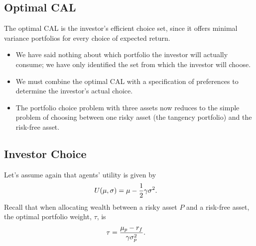 \documentclass[letterpaper,10pt,english]{sphinxmanual}
\begin{document}
\subsection{Optimal CAL}
\label{portfolioOpt:id8}
The optimal CAL is the investor's efficient choice set, since it
offers minimal variance portfolios for every choice of expected
return.
\begin{itemize}
\item {} 
We have said nothing about which portfolio the investor will
actually consume; we have only identified the set from which the
investor will choose.

\end{itemize}
\begin{itemize}
\item {} 
We must combine the optimal CAL with a specification of preferences
to determine the investor's actual choice.

\end{itemize}
\begin{itemize}
\item {} 
The portfolio choice problem with three assets now reduces to the
simple problem of choosing between one risky asset (the tangency
portfolio) and the risk-free asset.

\end{itemize}


\subsection{Investor Choice}
\label{portfolioOpt:investor-choice}
Let's assume again that agents' utility is given by
\begin{gather}
\begin{split}U(\mu, \sigma) & = \mu - \frac{1}{2} \gamma \sigma^2.\end{split}\notag
\end{gather}
Recall that when allocating wealth between a risky asset $P$ and
a risk-free asset, the optimal portfolio weight, $\tau$, is
\begin{gather}
\begin{split}\tau & = \frac{\mu_p - r_f}{\gamma \sigma^2_p}.\end{split}\notag
\end{gather}
\end{document}

